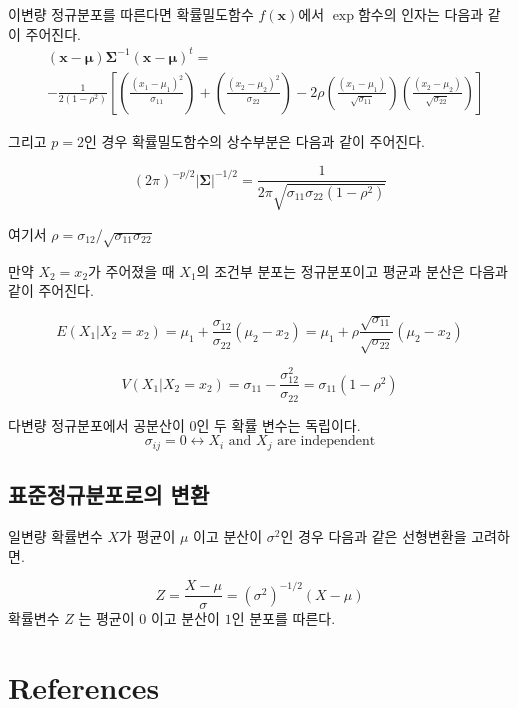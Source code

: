 \documentclass[
  11pt,
  a4paper,
  oneside]{scrbook}
\begin{document}
이변량 정규분포를 따른다면 확률밀도함수 \(f(\pmb x)\)에서 \(\exp\)함수의
인자는 다음과 같이 주어진다. \[
\begin{aligned}
&(\pmb x-\pmb \mu) \pmb \Sigma^{-1}(\pmb x-\pmb \mu)^t
= \\
&-\frac{1}{2 (1-\rho^2)} 
\left [ 
  \left ( \frac{(x_1-\mu_1)^2}{\sigma_{11}} \right )
  +\left ( \frac{(x_2-\mu_2)^2}{\sigma_{22}} \right )
  -2 \rho \left ( \frac{(x_1-\mu_1)}{\sqrt{\sigma_{11}}} \right )
  \left ( \frac{(x_2-\mu_2)}{\sqrt{\sigma_{22}}} \right )
  \right ]
\end{aligned}
\]

그리고 \(p=2\)인 경우 확률밀도함수의 상수부분은 다음과 같이 주어진다.

\[ (2 \pi)^{-p/2} | \pmb \Sigma|^{-1/2} = \frac{1}{ 2 \pi \sqrt{\sigma_{11} \sigma_{22} (1-\rho^2)}} \]

여기서 \(\rho = \sigma_{12} / \sqrt{\sigma_{11} \sigma_{22}}\)

만약 \(X_2 = x_2\)가 주어졌을 때 \(X_1\)의 조건부 분포는 정규분포이고
평균과 분산은 다음과 같이 주어진다.

\[ 
  E( X_1 |  X_2 =  x_2 ) =  \mu_1 +  \frac{\sigma_{12}}{\sigma_{22}} ( \mu_2 -  x_2)  = \mu_1 +  \rho \frac{\sqrt{\sigma_{11}}}{\sqrt{\sigma_{22}}} ( \mu_2 -  x_2) \]

\[
  V( X_1 |  X_2 =  x_2 )  =  \sigma_{11} - \frac{\sigma^2_{12}}{\sigma_{22}}  = \sigma_{11}(1-\rho^2)
\]

다변량 정규분포에서 공분산이 0인 두 확률 변수는 독립이다.
\[ \sigma_{ij} = 0 \leftrightarrow X_i \text{ and } X_j \text{ are independent} \]

\section{표준정규분포로의
변환}\label{uxd45cuxc900uxc815uxaddcuxbd84uxd3ecuxb85cuxc758-uxbcc0uxd658}

일변량 확률변수 \(X\)가 평균이 \(\mu\) 이고 분산이 \(\sigma^2\)인 경우
다음과 같은 선형변환을 고려하면.

\[ Z = \frac{X - \mu}{\sigma} = (\sigma^2)^{-1/2} (X-\mu) \] 확률변수
\(Z\) 는 평균이 \(0\) 이고 분산이 \(1\)인 분포를 따른다.


\chapter*{References}\label{references}


\label{refs}


\backmatter
\end{document}

